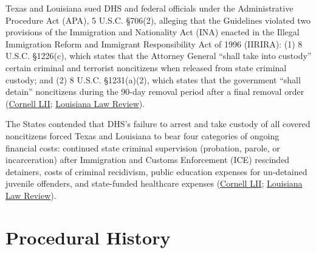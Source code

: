 \documentclass[12pt]{article}
\begin{document}
Texas and Louisiana sued DHS and federal officials under the Administrative Procedure Act (APA), 5 U.S.C. \S 706(2), alleging that the Guidelines violated two provisions of the Immigration and Nationality Act (INA) enacted in the Illegal Immigration Reform and Immigrant Responsibility Act of 1996 (IIRIRA): (1) 8 U.S.C. \S 1226(c), which states that the Attorney General ``shall take into custody'' certain criminal and terrorist noncitizens when released from state criminal custody; and (2) 8 U.S.C. \S 1231(a)(2), which states that the government ``shall detain'' noncitizens during the 90-day removal period after a final removal order (\href{https://www.law.cornell.edu/supremecourt/text/22-58}{Cornell LII}; \href{https://lawreview.law.lsu.edu/archives/3081}{Louisiana Law Review}).

The States contended that DHS's failure to arrest and take custody of all covered noncitizens forced Texas and Louisiana to bear four categories of ongoing financial costs: continued state criminal supervision (probation, parole, or incarceration) after Immigration and Customs Enforcement (ICE) rescinded detainers, costs of criminal recidivism, public education expenses for un-detained juvenile offenders, and state-funded healthcare expenses (\href{https://www.law.cornell.edu/supremecourt/text/22-58}{Cornell LII}; \href{https://lawreview.law.lsu.edu/archives/3081}{Louisiana Law Review}).

\section{Procedural History}
\end{document}
